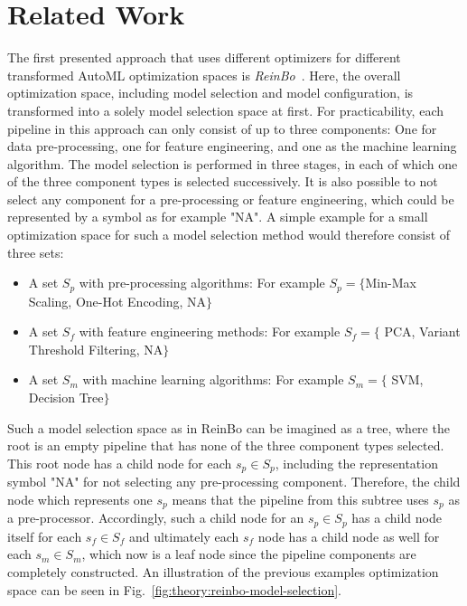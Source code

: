 \section{Related Work}
\label{sec:theory:related}
The first presented approach that uses different optimizers for different transformed AutoML optimization spaces is \textit{ReinBo}~\cite{Sun-ReinBo}.
Here, the overall optimization space, including model selection and model configuration, is transformed into a solely model selection space at first.
For practicability, each pipeline in this approach can only consist of up to three components: One for data pre-processing, one for feature engineering, and one as the machine learning algorithm.
The model selection is performed in three stages, in each of which one of the three component types is selected successively.
It is also possible to not select any component for a pre-processing or feature engineering, which could be represented by a symbol as for example "NA".
A simple example for a small optimization space for such a model selection method would therefore consist of three sets:
\begin{itemize}
    \item A set $S_p$ with pre-processing algorithms: For example $S_p=\{$Min-Max Scaling, One-Hot Encoding, NA$\}$
    \item A set $S_f$ with feature engineering methods: For example $S_f=\{$ PCA, Variant Threshold Filtering, NA$\}$
    \item A set $S_m$ with machine learning algorithms: For example $S_m=\{$ SVM, Decision Tree$\}$
\end{itemize}
Such a model selection space as in ReinBo can be imagined as a tree, where the root is an empty pipeline that has none of the three component types selected.
This root node has a child node for each $s_p \in S_p$, including the representation symbol "NA" for not selecting any pre-processing component.
Therefore, the child node which represents one $s_p$ means that the pipeline from this subtree uses $s_p$ as a pre-processor.
Accordingly, such a child node for an $s_p \in S_p$ has a child node itself for each $s_f \in S_f$ and ultimately each $s_f$ node has a child node as well for each $s_m \in S_m$, which now is a leaf node since the pipeline components are completely constructed.
An illustration of the previous examples optimization space can be seen in Fig.~\ref{fig:theory:reinbo-model-selection}.
